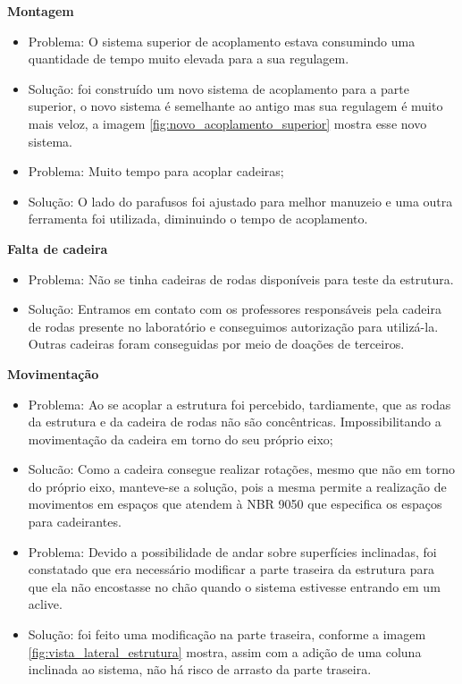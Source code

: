  \textbf{Montagem}

 \begin{itemize}
   \item Problema: O sistema superior de acoplamento estava consumindo uma quantidade de tempo muito elevada para a sua regulagem.
   \item Solução: foi construído um novo sistema de acoplamento para a parte superior, o novo sistema é semelhante ao antigo mas sua regulagem é muito mais veloz, a imagem \ref{fig:novo_acoplamento_superior} mostra esse novo sistema.

   \item Problema: Muito tempo para acoplar cadeiras;
   \item Solução: O lado do parafusos foi ajustado para melhor manuzeio e uma outra ferramenta foi utilizada, diminuindo o tempo de acoplamento.

 \end{itemize}

\textbf{Falta de cadeira}
 \begin{itemize}
  \item Problema: Não se tinha cadeiras de rodas disponíveis para teste da estrutura.
  \item Solução: Entramos em contato com os professores responsáveis pela cadeira de rodas presente no laboratório e conseguimos autorização para utilizá-la. Outras cadeiras foram conseguidas por meio de doações de terceiros.
 \end{itemize}

 \textbf{Movimentação}
   \begin{itemize}
     \item Problema: Ao se acoplar a estrutura foi percebido, tardiamente, que as rodas da estrutura e da cadeira de rodas não são concêntricas. Impossibilitando a movimentação da cadeira em torno do seu próprio eixo;
     \item Solucão: Como a cadeira consegue realizar rotações, mesmo que não em torno do próprio eixo, manteve-se a solução, pois a mesma permite a realização de movimentos em espaços que atendem à NBR 9050 que especifica os espaços para cadeirantes.
	 \item Problema: Devido a possibilidade de andar sobre superfícies inclinadas, foi constatado que era necessário modificar a parte traseira da estrutura para que ela não encostasse no chão quando o sistema estivesse entrando em um aclive.
     \item Solução: foi feito uma modificação na parte traseira, conforme a imagem \ref{fig:vista_lateral_estrutura} mostra, assim com a adição de uma coluna inclinada ao sistema, não há risco de arrasto da parte traseira.
   \end{itemize}
